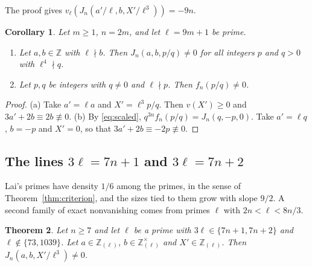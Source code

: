 \documentclass[11pt]{amsart}
\newtheorem{theorem}{Theorem}[section]
\newtheorem{corollary}[theorem]{Corollary}
\theoremstyle{definition}
\theoremstyle{remark}
\numberwithin{equation}{section}
\newcommand{\Z}{\mathbb Z}
\begin{document}
The proof gives $v_\ell(J_n(a'/\ell,b,X'/\ell^3))=-9n$.

\begin{corollary}\label{cor:NV}
Let $m\ge1$, $n=2m$, and let $\ell=9m+1$ be prime.
\begin{enumerate}[label=(\alph*)]
\item Let $a,b\in\Z$ with $\ell\nmid b$. Then $J_n(a,b,p/q)\ne0$ for all integers $p$ and $q>0$ with $\ell^4\nmid q$.
\item Let $p,q$ be integers with $q\ne0$ and $\ell\nmid p$. Then $f_n(p/q)\ne0$.
\end{enumerate}
\end{corollary}

\begin{proof}
(a) Take $a'=\ell a$ and $X'=\ell^3p/q$. Then $v(X')\ge0$ and $3a'+2b\equiv2b\not\equiv0$. (b) By \eqref{eq:scaled},
$q^{3n}f_n(p/q)=J_n(q,-p,0)$. Take $a'=\ell q$, $b=-p$ and $X'=0$, so that $3a'+2b\equiv-2p\not\equiv0$.
\end{proof}

\subsection{The lines \texorpdfstring{$3\ell=7n+1$}{3l = 7n+1} and \texorpdfstring{$3\ell=7n+2$}{3l = 7n+2}}
Lai's primes have density $1/6$ among the primes, in the sense of Theorem~\ref{thm:criterion}, and the sizes tied to
them grow with slope $9/2$. A second family of exact nonvanishing comes from primes $\ell$ with $2n<\ell<8n/3$.

\begin{theorem}\label{thm:NV7}
Let $n\ge7$ and let $\ell$ be a prime with $3\ell\in\{7n+1,7n+2\}$ and $\ell\notin\{73,1039\}$. Let $a\in\Z_{(\ell)}$,
$b\in\Z_{(\ell)}^\times$ and $X'\in\Z_{(\ell)}$. Then $J_n(a,b,X'/\ell^3)\ne0$.
\end{theorem}
\end{document}
